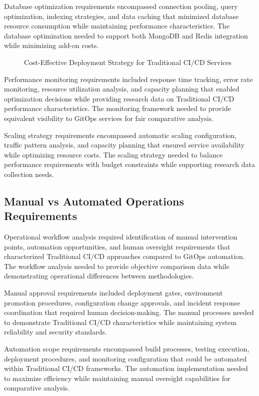 Database optimization requirements encompassed connection pooling, query optimization, indexing strategies, and data caching that minimized database resource consumption while maintaining performance characteristics. The database optimization needed to support both MongoDB and Redis integration while minimizing add-on costs.

\begin{figure}[H]
\centering
\caption{Cost-Effective Deployment Strategy for Traditional CI/CD Services}
\label{fig:cost-optimization-strategy}
\end{figure}

Performance monitoring requirements included response time tracking, error rate monitoring, resource utilization analysis, and capacity planning that enabled optimization decisions while providing research data on Traditional CI/CD performance characteristics. The monitoring framework needed to provide equivalent visibility to GitOps services for fair comparative analysis.

Scaling strategy requirements encompassed automatic scaling configuration, traffic pattern analysis, and capacity planning that ensured service availability while optimizing resource costs. The scaling strategy needed to balance performance requirements with budget constraints while supporting research data collection needs.

\subsection{Manual vs Automated Operations Requirements}

Operational workflow analysis required identification of manual intervention points, automation opportunities, and human oversight requirements that characterized Traditional CI/CD approaches compared to GitOps automation. The workflow analysis needed to provide objective comparison data while demonstrating operational differences between methodologies.

Manual approval requirements included deployment gates, environment promotion procedures, configuration change approvals, and incident response coordination that required human decision-making. The manual processes needed to demonstrate Traditional CI/CD characteristics while maintaining system reliability and security standards.

Automation scope requirements encompassed build processes, testing execution, deployment procedures, and monitoring configuration that could be automated within Traditional CI/CD frameworks. The automation implementation needed to maximize efficiency while maintaining manual oversight capabilities for comparative analysis.

